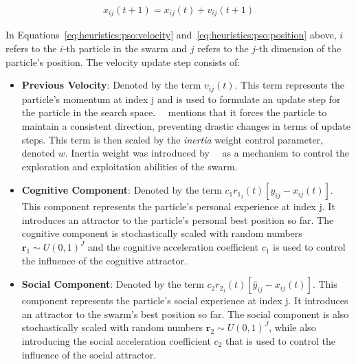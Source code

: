 \begin{equation}
	\label{eq:heuristics:pso:position}
	\begin{split}
		x_{ij}(t+1) = x_{ij}(t) + v_{ij}(t+1)
	\end{split}
\end{equation}

In Equations~\eqref{eq:heuristics:pso:velocity} and~\eqref{eq:heuristics:pso:position} above, $i$ refers to the $i$-th particle in the swarm and $j$ refers to the $j$-th dimension of  the particle's position. The velocity update step consists of:

\begin{itemize}
	\item \textbf{Previous Velocity}: Denoted by the term $v_{ij}(t)$. This term represents the particle's momentum at index j and is used to formulate an update step for the particle in the search space.~\citeauthor{ref:vanwyk:2014}~\cite{ref:vanwyk:2014} mentions that it forces the particle to maintain a consistent direction, preventing drastic changes in terms of update steps. This term is then scaled by the \textit{inertia} weight control parameter, denoted $w$. Inertia weight was introduced by~\citeauthor{ref:shi:1998}~\cite{ref:shi:1998} as a mechanism to control the exploration and exploitation abilities of the swarm.

	\item \textbf{Cognitive Component}: Denoted by the term $c_{1}r_{1_{j}}(t)[y_{ij} - x_{ij}(t)]$. This component represents the particle's personal experience at index j. It introduces an attractor to the particle's personal best position so far. The cognitive component is stochastically scaled with random numbers $\boldsymbol{r}_{1} \sim U(0,1)^J$ and the cognitive acceleration coefficient $c_{1}$ is used to control the influence of the cognitive attractor.

	\item \textbf{Social Component}: Denoted by the term $c_{2}r_{2_{j}}(t)[\hat{y}_{ij} - x_{ij}(t)]$. This component represents the particle's social experience at index j. It introduces an attractor to the swarm's best position so far. The social component is also stochastically scaled with random numbers $\boldsymbol{r}_{2} \sim U(0,1)^J$, while also introducing the social acceleration coefficient $c_{2}$ that is used to control the influence of the social attractor.
\end{itemize}

